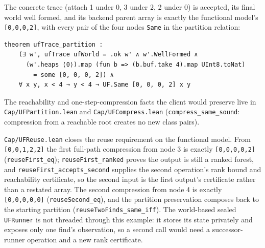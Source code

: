 \documentclass[10pt,a4paper]{article}
\newcommand{\file}[1]{\texttt{#1}}
\newcommand{\lean}[1]{\texttt{#1}}
\begin{document}
The concrete trace (attach 1 under 0, 3 under 2, 2 under 0) is accepted, its
final world well formed, and its backend parent array is exactly the functional
model's \lean{[0,0,0,2]}, with every pair of the four nodes \lean{Same} in the
partition relation:

\begin{lstlisting}
theorem ufTrace_partition :
    (∃ w', ufTrace ufWorld = .ok w' ∧ w'.WellFormed ∧
      (w'.heaps ⟨0⟩).map (fun b => (b.buf.take 4).map UInt8.toNat)
        = some [0, 0, 0, 2]) ∧
    ∀ x y, x < 4 → y < 4 → UF.Same [0, 0, 0, 2] x y
\end{lstlisting}

The reachability and one-step-compression facts the client would preserve live
in \file{Cap/UFPartition.lean} and \file{Cap/UFCompress.lean}
(\lean{compress\_same\_sound}: compression from a reachable root creates no new
class pairs).

\file{Cap/UFReuse.lean} closes the reuse requirement on the functional model.
From \lean{[0,0,1,2,2]} the first full-path compression from node 3 is exactly
\lean{[0,0,0,0,2]} (\lean{reuseFirst\_eq}); \lean{reuseFirst\_ranked} proves the
output is still a ranked forest, and \lean{reuseFirst\_accepts\_second} supplies
the second operation's rank bound and reachability certificate, so the second
input is the first output's certificate rather than a restated array. The second
compression from node 4 is exactly \lean{[0,0,0,0,0]}
(\lean{reuseSecond\_eq}), and the partition preservation composes back to the
starting partition (\lean{reuseTwoFinds\_same\_iff}). The world-based sealed
\lean{UFRunner} is not threaded through this example: it stores its state
privately and exposes only one find's observation, so a second call would need a
successor-runner operation and a new rank certificate.
\end{document}
